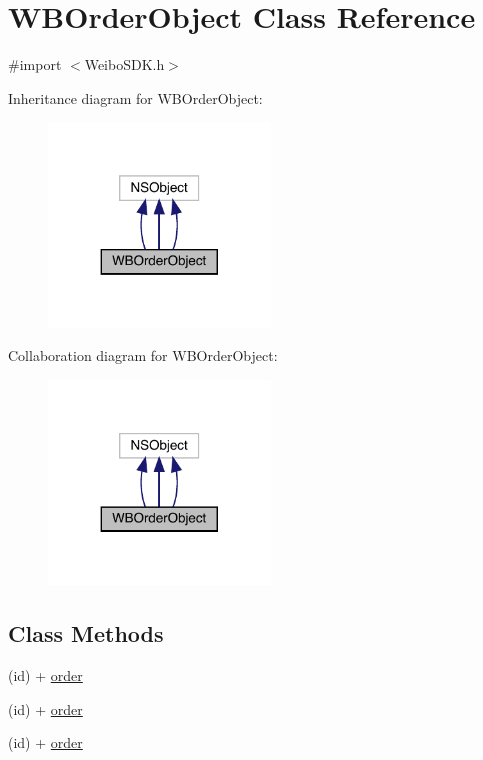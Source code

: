 \hypertarget{interface_w_b_order_object}{}\section{W\+B\+Order\+Object Class Reference}
\label{interface_w_b_order_object}


{\ttfamily \#import $<$Weibo\+S\+D\+K.\+h$>$}



Inheritance diagram for W\+B\+Order\+Object\+:\nopagebreak
\begin{figure}[H]
\begin{center}
\leavevmode
\includegraphics[width=167pt]{interface_w_b_order_object__inherit__graph}
\end{center}
\end{figure}


Collaboration diagram for W\+B\+Order\+Object\+:\nopagebreak
\begin{figure}[H]
\begin{center}
\leavevmode
\includegraphics[width=167pt]{interface_w_b_order_object__coll__graph}
\end{center}
\end{figure}
\subsection*{Class Methods}
\begin{DoxyCompactItemize}
\item 
(id) + \mbox{\hyperlink{interface_w_b_order_object_a6a258f7fa5542702bfd47a7ae5da1078}{order}}
\item 
(id) + \mbox{\hyperlink{interface_w_b_order_object_a6a258f7fa5542702bfd47a7ae5da1078}{order}}
\item 
(id) + \mbox{\hyperlink{interface_w_b_order_object_a6a258f7fa5542702bfd47a7ae5da1078}{order}}
\end{DoxyCompactItemize}
